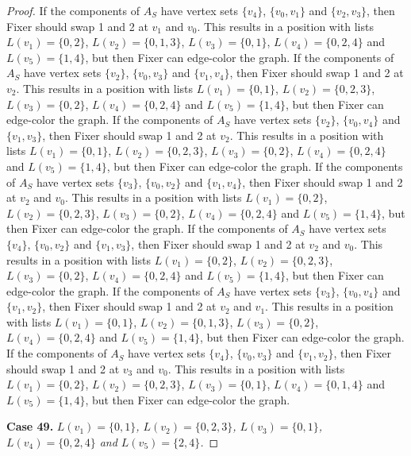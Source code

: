 \documentclass[12pt]{amsart}
\theoremstyle{plain}
\theoremstyle{definition}
\theoremstyle{remark}
\begin{document}
\begin{proof}
If the components of $A_S$ have vertex sets $\{v_4\}$, $\{v_0, v_1\}$ and $\{v_2, v_3\}$, then Fixer should swap 1 and 2 at $v_1$ and $v_0$. This results in a position with lists $L(v_1) = \{0, 2\}$, $L(v_2) = \{0, 1, 3\}$, $L(v_3) = \{0, 1\}$, $L(v_4) = \{0, 2, 4\}$ and $L(v_5) = \{1, 4\}$, but then Fixer can edge-color the graph.
If the components of $A_S$ have vertex sets $\{v_2\}$, $\{v_0, v_3\}$ and $\{v_1, v_4\}$, then Fixer should swap 1 and 2 at $v_2$. This results in a position with lists $L(v_1) = \{0, 1\}$, $L(v_2) = \{0, 2, 3\}$, $L(v_3) = \{0, 2\}$, $L(v_4) = \{0, 2, 4\}$ and $L(v_5) = \{1, 4\}$, but then Fixer can edge-color the graph.
If the components of $A_S$ have vertex sets $\{v_2\}$, $\{v_0, v_4\}$ and $\{v_1, v_3\}$, then Fixer should swap 1 and 2 at $v_2$. This results in a position with lists $L(v_1) = \{0, 1\}$, $L(v_2) = \{0, 2, 3\}$, $L(v_3) = \{0, 2\}$, $L(v_4) = \{0, 2, 4\}$ and $L(v_5) = \{1, 4\}$, but then Fixer can edge-color the graph.
If the components of $A_S$ have vertex sets $\{v_3\}$, $\{v_0, v_2\}$ and $\{v_1, v_4\}$, then Fixer should swap 1 and 2 at $v_2$ and $v_0$. This results in a position with lists $L(v_1) = \{0, 2\}$, $L(v_2) = \{0, 2, 3\}$, $L(v_3) = \{0, 2\}$, $L(v_4) = \{0, 2, 4\}$ and $L(v_5) = \{1, 4\}$, but then Fixer can edge-color the graph.
If the components of $A_S$ have vertex sets $\{v_4\}$, $\{v_0, v_2\}$ and $\{v_1, v_3\}$, then Fixer should swap 1 and 2 at $v_2$ and $v_0$. This results in a position with lists $L(v_1) = \{0, 2\}$, $L(v_2) = \{0, 2, 3\}$, $L(v_3) = \{0, 2\}$, $L(v_4) = \{0, 2, 4\}$ and $L(v_5) = \{1, 4\}$, but then Fixer can edge-color the graph.
If the components of $A_S$ have vertex sets $\{v_3\}$, $\{v_0, v_4\}$ and $\{v_1, v_2\}$, then Fixer should swap 1 and 2 at $v_2$ and $v_1$. This results in a position with lists $L(v_1) = \{0, 1\}$, $L(v_2) = \{0, 1, 3\}$, $L(v_3) = \{0, 2\}$, $L(v_4) = \{0, 2, 4\}$ and $L(v_5) = \{1, 4\}$, but then Fixer can edge-color the graph.
If the components of $A_S$ have vertex sets $\{v_4\}$, $\{v_0, v_3\}$ and $\{v_1, v_2\}$, then Fixer should swap 1 and 2 at $v_3$ and $v_0$. This results in a position with lists $L(v_1) = \{0, 2\}$, $L(v_2) = \{0, 2, 3\}$, $L(v_3) = \{0, 1\}$, $L(v_4) = \{0, 1, 4\}$ and $L(v_5) = \{1, 4\}$, but then Fixer can edge-color the graph.

\noindent\textbf{Case 49.  }\textit{$L(v_1) = \{0, 1\}$, $L(v_2) = \{0, 2, 3\}$, $L(v_3) = \{0, 1\}$, $L(v_4) = \{0, 2, 4\}$ and $L(v_5) = \{2, 4\}$.}


\end{proof}
\end{document}
